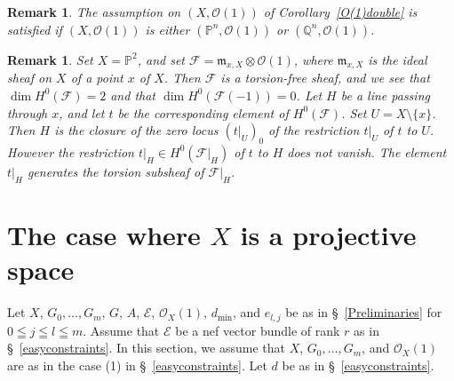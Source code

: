 \documentclass[a4paper,12pt]{amsart}
\newtheorem{rmk}[thm]{Remark}%
\begin{document}
\begin{rmk}
The assumption on $(X,\mathcal{O}(1))$ of Corollary~\ref{O(1)double}
is satisfied if 
$(X,\mathcal{O}(1))$ is either $(\mathbb{P}^n,\mathcal{O}(1))$ or $(\mathbb{Q}^n,\mathcal{O}(1))$.
\end{rmk}

\begin{rmk}
Set $X=\mathbb{P}^2$, and set $\mathcal{F}=\mathfrak{m}_{x,X}\otimes\mathcal{O}(1)$,
where $\mathfrak{m}_{x,X}$ is the ideal sheaf on $X$ of a point $x$ of $X$.
Then $\mathcal{F}$ is a torsion-free sheaf,
and we see that $\dim H^0(\mathcal{F})=2$ and that $\dim H^0(\mathcal{F}(-1))=0$.
Let $H$ be a line passing through $x$,
and let $t$ be the corresponding element of $H^0(\mathcal{F})$.
Set $U=X\setminus\{x\}$. Then $H$ is the closure of the zero locus $(t|_U)_0$
of the restriction $t|_U$ of $t$ to $U$. However the restriction $t|_H\in H^0(\mathcal{F}|_H)$ of $t$
to $H$ does not vanish.
The element $t|_H$ generates the torsion subsheaf of $\mathcal{F}|_H$.
\end{rmk}

\section{The case where $X$ is a projective space}
Let $X$, $G_0,\dots,G_m$,
$G$, $A$, 
$\mathcal{E}$, $\mathcal{O}_X(1)$,
$d_{\min}$, 
and 
$e_{l,j}$
be as in \S~\ref{Preliminaries}
for $0\leqq j\leqq l\leqq m$.
Assume that $\mathcal{E}$ be a nef vector bundle of rank $r$ as in \S~\ref{easyconstraints}.
In this section, we assume 
that $X$, $G_0,\dots,G_m$, and $\mathcal{O}_X(1)$ are as in the case (1) in \S~\ref{easyconstraints}.
Let $d$ be as in \S~\ref{easyconstraints}. 
\end{document}
